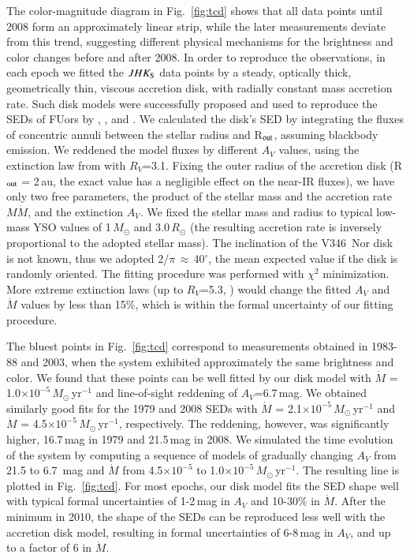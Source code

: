 \documentclass{aa}
\begin{document}
The color-magnitude diagram in Fig.~\ref{fig:tcd} shows that all data
points until 2008 form an approximately linear strip, while the later
measurements deviate from this trend, suggesting different physical
mechanisms for the brightness and color changes before and after
2008. In order to reproduce the observations, in each epoch we fitted
the $JHK_{\rm S}$ data points by a steady, optically thick,
geometrically thin, viscous accretion disk, with radially constant
mass accretion rate. Such disk models were successfully proposed and
used to reproduce the SEDs of FUors by \citet{hk96}, \citet{zhu2007},
and \citet{kospal2016}. We calculated the disk's SED by integrating
the fluxes of concentric annuli between the stellar radius and R$_{\rm
  out}$, assuming blackbody emission. We reddened the model fluxes by
different $A_{V}$ values, using the extinction law from
\citet{savage1979} with $R_V$=3.1. Fixing the outer radius of the
accretion disk (R$_{\rm out}$ = 2\,au, the exact value has a
negligible effect on the near-IR fluxes), we have only two free
parameters, the product of the stellar mass and the accretion rate
$M\dot{M}$, and the extinction $A_{V}$. We fixed the stellar mass and
radius to typical low-mass YSO values of 1$\,M_{\odot}$ and
3.0$\,R_{\odot}$ (the resulting accretion rate is inversely
proportional to the adopted stellar mass). The inclination of the
V346~Nor disk is not known, thus we adopted
2/$\pi\,{\approx}\,$40$^{\circ}$, the mean expected value if the disk
is randomly oriented. The fitting procedure was performed with
$\chi^2$ minimization. More extreme extinction laws (up to $R_V$=5.3,
\citealt{cardelli1989}) would change the fitted $A_{V}$ and $\dot{M}$
values by less than 15\%, which is within the formal uncertainty of
our fitting procedure.

The bluest points in Fig.~\ref{fig:tcd} correspond to measurements
obtained in 1983-88 and 2003, when the system exhibited approximately
the same brightness and color. We found that these points can be well
fitted by our disk model with $\dot{M}$ =
1.0$\times10^{-5}\,M_{\odot}$\,yr$^{-1}$ and line-of-sight reddening
of $A_V$=6.7\,mag. We obtained similarly good fits for the 1979 and
2008 SEDs with $\dot{M}$ = 2.1$\times10^{-5}\,M_{\odot}$\,yr$^{-1}$
and $\dot{M}$ = 4.5$\times10^{-5}\,M_{\odot}$\,yr$^{-1}$,
respectively. The reddening, however, was significantly higher,
16.7\,mag in 1979 and 21.5\,mag in 2008. We simulated the time
evolution of the system by computing a sequence of models of gradually
changing $A_V$ from 21.5 to 6.7~mag and $\dot{M}$ from
4.5$\times10^{-5}$ to 1.0$\times10^{-5}\,M_{\odot}$\,yr$^{-1}$. The
resulting line is plotted in Fig.~\ref{fig:tcd}. For most epochs, our
disk model fits the SED shape well with typical formal uncertainties
of 1-2\,mag in $A_V$ and 10-30\% in $\dot{M}$. After the minimum in
2010, the shape of the SEDs can be reproduced less well with the
accretion disk model, resulting in formal uncertainties of 6-8\,mag in
$A_V$, and up to a factor of 6 in $\dot{M}$.
\end{document}

